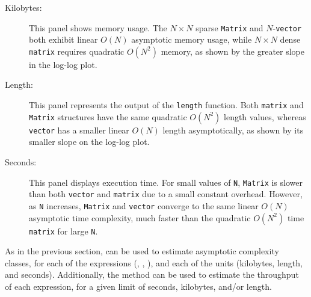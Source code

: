 \begin{description}
\item[Kilobytes:] This panel shows memory usage. 
The $N\times N$ sparse \texttt{Matrix} and $N$-\texttt{vector} both exhibit linear $O(N)$ asymptotic memory usage, while $N\times N$ dense \texttt{matrix} requires quadratic $O(N^2)$ memory, as shown by the greater slope in the log-log plot.
\item[Length:] This panel represents the output of the \texttt{length} function. 
Both \texttt{matrix} and \texttt{Matrix} structures have the same quadratic $O(N^2)$ length values, whereas \texttt{vector} has a smaller linear $O(N)$ length asymptotically, as shown by its smaller slope on the log-log plot.
\item[Seconds:] This panel displays execution time. 
For small values of \texttt{N}, \texttt{Matrix} is slower than both \texttt{vector} and \texttt{matrix} due to a small constant overhead. However, as \texttt{N} increases, \texttt{Matrix} and \texttt{vector} converge to the same linear $O(N)$ asymptotic time complexity, much faster than the quadratic $O(N^2)$ time \texttt{matrix} for large \texttt{N}.
\end{description}
As in the previous section,  can be used to estimate asymptotic complexity classes, for each of the expressions (, , ), and each of the units (kilobytes, length, and seconds). 
Additionally, the  method can be used to estimate the throughput of each expression, for a given limit of seconds, kilobytes, and/or length.

